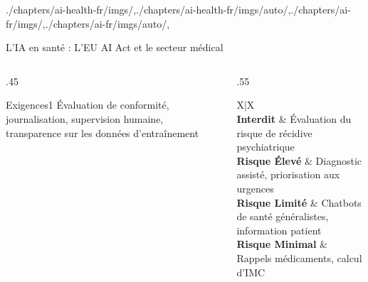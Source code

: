 \begin{graphicspathcontext}{{./chapters/ai-health-fr/imgs/},{./chapters/ai-health-fr/imgs/auto/},{./chapters/ai-fr/imgs/},{./chapters/ai-fr/imgs/auto/},\old}
\begin{frame}[t]{{L'IA en santé :} L'EU AI Act et le secteur médical}
	\begin{columns}
		\begin{column}{.45\linewidth}
			\vspace{.3cm}
			\begin{rightanchorblock}{Exigences}{1}
			Évaluation de conformité, journalisation, supervision humaine, transparence sur les données d'entraînement
			\end{rightanchorblock}
		\end{column}
		\begin{column}{.55\linewidth}
			\begin{stabularx}{X|X}
			 \\
			\textbf{Interdit} & Évaluation du risque de récidive psychiatrique \\
			\hline
			\textbf{Risque Élevé} & Diagnostic assisté, priorisation aux urgences \\
			\hline
			\textbf{Risque Limité} & Chatbots de santé généralistes, information patient \\
			\hline
			\textbf{Risque Minimal} & Rappels médicaments, calcul d'IMC \\
			\end{stabularx}
		\end{column}
	\end{columns}
\end{frame}

\end{graphicspathcontext}

\endinput
